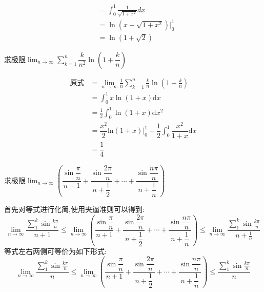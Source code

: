\documentclass[8pt a4paper, oneside, UTF8]{ctexbook}
\begin{document}
\begin{sloppypar}
\begin{solution}
\begin{align*}
                      & = \int_{0}^{1}\frac{1}{\sqrt{1+x^{2}}}dx                                                                                                                      \\
                      & = \ln (x+\sqrt{1+x^{2}})|_{0}^{1}                                                                                                                             \\
                      & =\ln(1+\sqrt{2})
        \end{align*}
    \end{solution}
    \begin{problem}
    \uline{求极限}$\lim_{n\to\infty}\sum_{k=1}^n\dfrac{k}{n^2}\ln\left(1+\dfrac{k}{n}\right)$
    \end{problem}
    \begin{solution}
        \begin{align*}
            \text{原式} & =\lim_{n\to\infty}\frac1n\sum_{k=1}^n\frac kn\ln\left(1+\frac kn\right)             \\
                      & = \int_0^1x\ln(1+x)\mathrm{d}x                                                      \\
                      & = \frac12\int_0^1\ln\left(1+x\right)\mathrm{d}x^2                                   \\
                      & =\dfrac{x^2}2\mathrm{ln}(1+x)\Bigg|_0^1-\dfrac12\int_0^1\dfrac{x^2}{1+x}\mathrm{d}x \\
                      & = \dfrac{1}{4}
        \end{align*}
    \end{solution}
    \begin{problem}
    求极限$\lim_{n\to\infty}\left(\dfrac{\sin\dfrac\pi n}{n+1}+\dfrac{\sin\dfrac{2\pi}n}{n+\dfrac12}+\cdots+\dfrac{\sin\dfrac{n\pi}n}{n+\dfrac1n}\right)$
    \end{problem}
    \begin{solution}
        首先对等式进行化简,使用夹逼准则可以得到:
        $$
            \lim_{n \to \infty}\dfrac{\sum_{1}^{k}\sin \frac{k \pi}{n}}{n+1} \leqslant \lim_{n\to\infty}\left(\dfrac{\sin\dfrac\pi n}{n+1}+\dfrac{\sin\dfrac{2\pi}n}{n+\dfrac12}+\cdots+\dfrac{\sin\dfrac{n\pi}n}{n+\dfrac1n}\right) \leqslant \lim_{n\to \infty}\dfrac{\sum_{1}^{k} \sin\frac{k \pi}{n}}{n+\frac1n}
        $$
        等式左右两侧可等价为如下形式:
        $$
            \lim_{n \to \infty}\dfrac{\sum_{1}^{k}\sin \frac{k \pi}{n}}{n} \leqslant \lim_{n\to\infty}\left(\dfrac{\sin\dfrac\pi n}{n+1}+\dfrac{\sin\dfrac{2\pi}n}{n+\dfrac12}+\cdots+\dfrac{\sin\dfrac{n\pi}n}{n+\dfrac1n}\right) \leqslant \dfrac{\sum_{1}^{k}\sin \frac{k \pi}{n}}{n}
$$
\end{solution}
\end{sloppypar}
\end{document}
